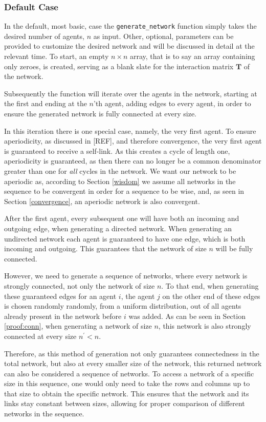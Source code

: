 \documentclass[a4paper, 12pt]{report}
\newcommand{\T}{\bm{T}}
\begin{document}
\subsubsection{Default Case}
In the default, most basic, case the \texttt{generate\_network} function simply takes the desired number of agents, $n$ as input. Other, optional, parameters can be provided to customize the desired network and will be discussed in detail at the relevant time. To start, an empty $n\times n$ array,  that is to say an array containing only zeroes, is created, serving as a blank slate for the interaction matrix $\T$ of the network. 

\noindent Subsequently the function will iterate over the agents in the network, starting at the first and ending at the $n$'th agent, adding edges to every agent, in order to ensure the generated network is fully connected at every size. 

\noindent In this iteration there is one special case, namely, the very first agent. To ensure aperiodicity, as discussed in [REF], and therefore convergence, the very first agent is guaranteed to receive a self-link. As this creates a cycle of length one, aperiodicity is guaranteed, as then there can no longer be a common denominator greater than one for \emph{all} cycles in the network. We want our network to be aperiodic as, according to Section \ref{wisdom} we assume all networks in the sequence to be convergent in order for a sequence to be wise, and, as seen in Section \ref{convergence}, an aperiodic network is also convergent.

\noindent After the first agent, every subsequent one will have both an incoming and outgoing edge, when generating a directed network. When generating an undirected network each agent is guaranteed to have one edge, which is both incoming and outgoing. This guarantees that the network of size $n$ will be fully connected. 

\noindent However, we need to generate a sequence of networks, where every network is strongly connected, not only the network of size $n$. To that end, when generating these guaranteed edges for an agent $i$, the agent $j$ on the other end of these edges is chosen randomly randomly, from a uniform distribution, out of all agents already present in the network before $i$ was added. As can be seen in Section \ref{proof:conn}, when generating a network of size $n$, this network is also strongly connected at every size $n^{\prime} < n$.

\noindent Therefore, as this method of generation not only guarantees connectedness in the total network, but also at every smaller size of the network, this returned network can also be considered a sequence of networks. To access a network of a specific size in this sequence, one would only need to take the rows and columns up to that size to obtain the specific network. This ensures that the network and its links stay constant between sizes, allowing for proper comparison of different networks in the sequence. 
\end{document}
